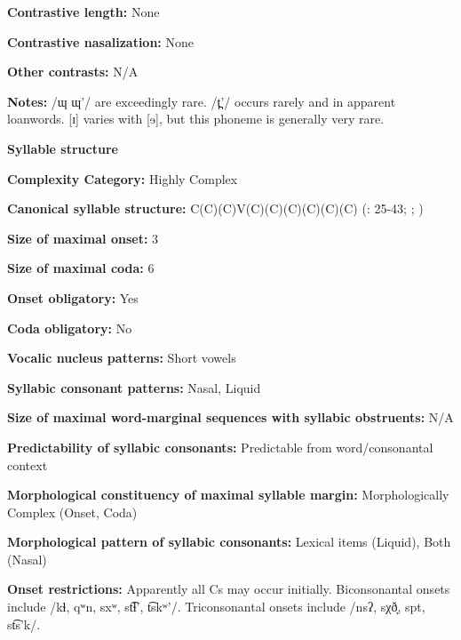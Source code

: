 \textbf{Contrastive length:} None



\textbf{Contrastive nasalization:} None



\textbf{Other contrasts:} N/A



\textbf{Notes:} /ɰ ɰ’/ are exceedingly rare. /t̪’/ occurs rarely and in apparent loanwords. [ɪ] varies with [ɘ], but this phoneme is generally very rare.



\textbf{Syllable structure}



\textbf{Complexity Category:} Highly Complex



\textbf{Canonical syllable structure:} C(C)(C)V(C)(C)(C)(C)(C)(C) (\citealt{ThompsonThompson1992}: 25-43; \citealt{ThompsonThompson1996}; \citealt{ThompsonEtAl1996})



\textbf{Size of maximal onset:} 3



\textbf{Size of maximal coda:} 6



\textbf{Onset obligatory:} Yes



\textbf{Coda obligatory:} No



\textbf{Vocalic nucleus patterns:} Short vowels



\textbf{Syllabic consonant patterns:} Nasal, Liquid



\textbf{Size of maximal word{}-marginal sequences with syllabic obstruents:} N/A



\textbf{Predictability of syllabic consonants:} Predictable from word/consonantal context



\textbf{Morphological constituency of maximal syllable margin:} Morphologically Complex (Onset, Coda)



\textbf{Morphological pattern of syllabic consonants:} Lexical items (Liquid), Both (Nasal)



\textbf{Onset restrictions:} Apparently all Cs may occur initially. Biconsonantal onsets include /kɬ, qʷn, sxʷ, st͡ɬ’, t͡skʷ’/. Triconsonantal onsets include /nsʔ, sχð̞, spt, st͡s’k/.



